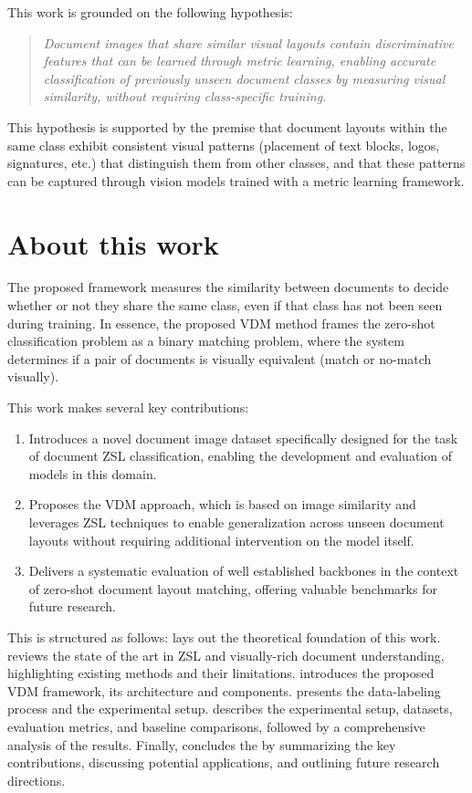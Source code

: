 This work is grounded on the following hypothesis:
\begin{quote}
\textit{Document images that share similar visual layouts contain discriminative features that can be learned through metric learning, enabling accurate classification of previously unseen document classes by measuring visual similarity, without requiring class-specific training.}
\end{quote}
This hypothesis is supported by the premise that document layouts within the same class exhibit consistent visual patterns (placement of text blocks, logos, signatures, etc.) that distinguish them from other classes, and that these patterns can be captured through vision models trained with a metric learning framework.

\section{About this work}

The proposed framework measures the similarity between documents to decide whether or not they share the same class, even if that class has not been seen during training. In essence, the proposed \gls{VDM} method frames the zero-shot classification problem as a binary matching problem, where the system determines if a pair of documents is visually equivalent (match or no-match visually).

This work makes several key contributions:
\begin{enumerate}
    \item Introduces a novel document image dataset specifically designed for the task of document \gls{ZSL} classification, enabling the development and evaluation of models in this domain.
    \item Proposes the \gls{VDM} approach, which is based on image similarity and leverages \gls{ZSL} techniques to enable generalization across unseen document layouts without requiring additional intervention on the model itself.
    \item Delivers a systematic evaluation of well established backbones in the context of zero-shot document layout matching, offering valuable benchmarks for future research.
\end{enumerate}

This  is structured as follows:  lays out the theoretical foundation of this work.  reviews the state of the art in \gls{ZSL} and visually-rich document understanding, highlighting existing methods and their limitations.  introduces the proposed \gls{VDM} framework, its architecture and components.  presents the data-labeling process and the experimental setup.  describes the experimental setup, datasets, evaluation metrics, and baseline comparisons, followed by a comprehensive analysis of the results. Finally,  concludes the  by summarizing the key contributions, discussing potential applications, and outlining future research directions.

